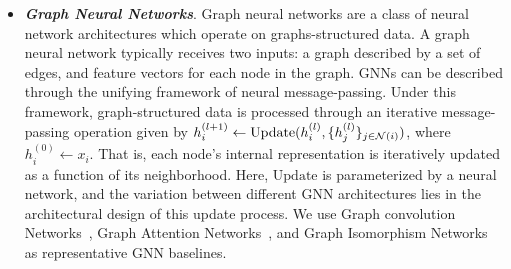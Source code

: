 \begin{itemize}
    \item \textbf{\textit{Graph Neural Networks}}. Graph neural networks are a class of neural network architectures which operate on graphs-structured data. A graph neural network typically receives two inputs: a graph described by a set of edges, and feature vectors for each node in the graph. GNNs can be described through the unifying framework of neural message-passing. Under this framework, graph-structured data is processed through an iterative message-passing operation given by $h_i^{(l+1)} \gets \mathrm{Update}(h_i^{(l)}, \{h_j^{(l)}\}_{j \in {\mathcal{N}}(i)})$, where $h_i^{(0)} \gets x_i$. That is, each node's internal representation is iteratively updated as a function of its neighborhood. Here, $\mathrm{Update}$ is parameterized by a neural network, and the variation between different GNN architectures lies in the architectural design of this update process. We use Graph convolution Networks~\citep{kipfSemiSupervisedClassificationGraph2017}, Graph Attention Networks~\citep{velickovicGraphAttentionNetworks2017}, and Graph Isomorphism Networks~\citep{xuHowPowerfulAre2018} as representative GNN baselines.
\end{itemize}




